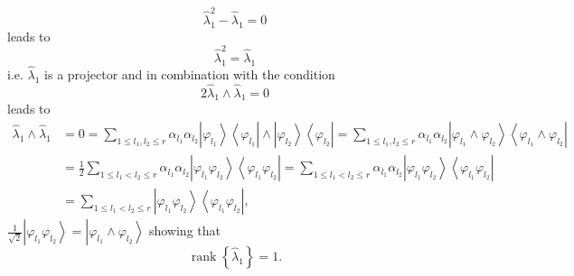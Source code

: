 \documentclass[aps,preprint]{revtex4}%
\begin{document}
\begin{equation}
\hat{\lambda}_{1}^{2}-\hat{\lambda}_{1}=0
\end{equation}
leads to
\begin{equation}
\hat{\lambda}_{1}^{2}=\hat{\lambda}_{1}%
\end{equation}
i.e. $\hat{\lambda}_{1}$ is a projector and in combination with the condition
\begin{equation}
2\hat{\lambda}_{1}\wedge\hat{\lambda}_{1}=0
\end{equation}
leads to
\begin{align}
\hat{\lambda}_{1}\wedge\hat{\lambda}_{1}  &  =0=\sum_{1\leq l_{1},l_{2}\leq
r}\alpha_{l_{1}}\alpha_{l_{2}}\left\vert \varphi_{l_{1}}\right\rangle
\left\langle \varphi_{l_{1}}\right\vert \wedge\left\vert \varphi_{l_{2}%
}\right\rangle \left\langle \varphi_{l_{2}}\right\vert =\sum_{1\leq
l_{1},l_{2}\leq r}\alpha_{l_{1}}\alpha_{l_{2}}\left\vert \varphi_{l_{1}}%
\wedge\varphi_{l_{2}}\right\rangle \left\langle \varphi_{l_{1}}\wedge
\varphi_{l_{2}}\right\vert \nonumber\\
&  =\frac{1}{2}\sum_{1\leq l_{1}<l_{2}\leq r}\alpha_{l_{1}}\alpha_{l_{2}%
}\left\vert \varphi_{l_{1}}\varphi_{l_{2}}\right\rangle \left\langle
\varphi_{l_{1}}\varphi_{l_{2}}\right\vert =\sum_{1\leq l_{1}<l_{2}\leq
r}\alpha_{l_{1}}\alpha_{l_{2}}\left\vert \varphi_{l_{1}}\varphi_{l_{2}%
}\right\rangle \left\langle \varphi_{l_{1}}\varphi_{l_{2}}\right\vert
\nonumber\\
&  =\sum_{1\leq l_{1}<l_{2}\leq r}\left\vert \varphi_{l_{1}}\varphi_{l_{2}%
}\right\rangle \left\langle \varphi_{l_{1}}\varphi_{l_{2}}\right\vert ,
\end{align}
$\frac{1}{\sqrt{2}}\left\vert \varphi_{l_{1}}\varphi_{l_{2}}\right\rangle
=\left\vert \varphi_{l_{1}}\wedge\varphi_{l_{2}}\right\rangle $ showing that
\begin{equation}
\operatorname*{rank}\left\{  \hat{\lambda}_{1}\right\}  =1.
\end{equation}
\end{document}
